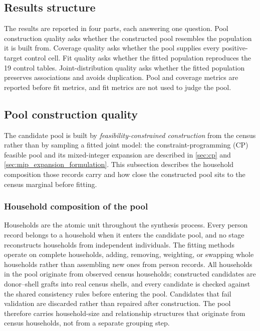 \documentclass[review]{elsarticle}
\begin{document}



\subsection*{Results structure}
The results are reported in four parts, each answering one question. Pool
construction quality asks whether the constructed pool resembles the
population it is built from. Coverage quality asks whether the pool supplies
every positive-target control cell. Fit quality asks whether the fitted
population reproduces the 19 control tables. Joint-distribution quality asks
whether the fitted population preserves associations and avoids duplication.
Pool and coverage metrics are reported before fit metrics, and fit metrics are
not used to judge the pool.

\subsection{Pool construction quality}
\label{sec:pool_construction}

The candidate pool is built by \emph{feasibility-constrained construction} from the census rather than by sampling a fitted joint model: the constraint-programming (CP) feasible pool and its mixed-integer expansion are described in \cref{sec:cp} and \cref{sec:mip_expansion_formulation}. This subsection describes the household composition those records carry and how
close the constructed pool sits to the census marginal before fitting.

\subsubsection{Household composition of the pool}
\label{sec:households}
Households are the atomic unit throughout the synthesis process. Every person
record belongs to a household when it enters the candidate pool, and no stage
reconstructs households from independent individuals. The fitting methods
operate on complete households, adding, removing, weighting, or swapping whole
households rather than assembling new ones from person records. All households
in the pool originate from observed census households; constructed candidates
are donor--shell grafts into real census shells, and every candidate is checked
against the shared consistency rules before entering the pool. Candidates that
fail validation are discarded rather than repaired after construction. The pool
therefore carries household-size and relationship structures that originate
from census households, not from a separate grouping step.
\end{document}
